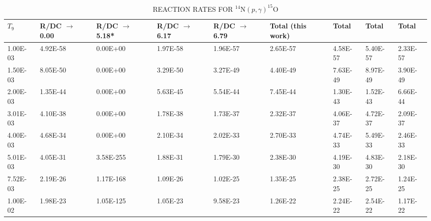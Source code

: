 \begin{table}
\caption{REACTION RATES FOR $^{14}$N$(p,\gamma)^{15}$O }
\begin{center}
\begin{threeparttable}
\begin{tabular}{@{}lllllllll@{}}
\toprule
$T_{9}$       & R/DC $\rightarrow$ 0.00 & R/DC $\rightarrow$ 5.18* & R/DC $\rightarrow$ 6.17 & R/DC $\rightarrow$ 6.79 & Total (this work) & Total \cite{Caughlan1988} & Total \cite{Angulo1999} & Total \cite{Imbriani2005} \\ \midrule
1.00E-03 & 4.92E-58                & 0.00E+00                 & 1.97E-58                & 1.96E-57                & 2.65E-57          & 4.58E-57                  & 5.40E-57                & 2.33E-57                  \\
1.50E-03 & 8.05E-50                & 0.00E+00                 & 3.29E-50                & 3.27E-49                & 4.40E-49          & 7.63E-49                  & 8.97E-49                & 3.90E-49                  \\
2.00E-03 & 1.35E-44                & 0.00E+00                 & 5.63E-45                & 5.54E-44                & 7.45E-44          & 1.30E-43                  & 1.52E-43                & 6.66E-44                  \\
3.01E-03 & 4.10E-38                & 0.00E+00                 & 1.78E-38                & 1.73E-37                & 2.32E-37          & 4.06E-37                  & 4.72E-37                & 2.09E-37                  \\
4.00E-03 & 4.68E-34                & 0.00E+00                 & 2.10E-34                & 2.02E-33                & 2.70E-33          & 4.74E-33                  & 5.49E-33                & 2.46E-33                  \\
5.01E-03 & 4.05E-31                & 3.58E-255                & 1.88E-31                & 1.79E-30                & 2.38E-30          & 4.19E-30                  & 4.83E-30                & 2.18E-30                  \\
7.52E-03 & 2.19E-26                & 1.17E-168                & 1.09E-26                & 1.02E-25                & 1.35E-25          & 2.38E-25                  & 2.72E-25                & 1.24E-25                  \\
1.00E-02 & 1.98E-23                & 1.05E-125                & 1.05E-23                & 9.58E-23                & 1.26E-22          & 2.24E-22                  & 2.54E-22                & 1.17E-22                  \\

\end{tabular}
\end{threeparttable}
\end{center}
\end{table}
